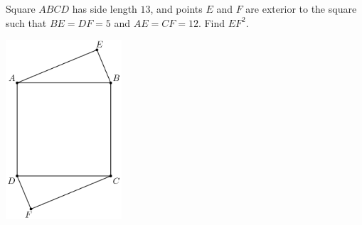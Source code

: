 Square $ABCD$ has side length $13$, and points $E$ and $F$ are exterior to the square such that $BE=DF=5$ and $AE=CF=12$. Find $EF^{2}$.
\begin{center}
\includegraphics[width = 43.0mm]{img/fig0.png}
\end{center}